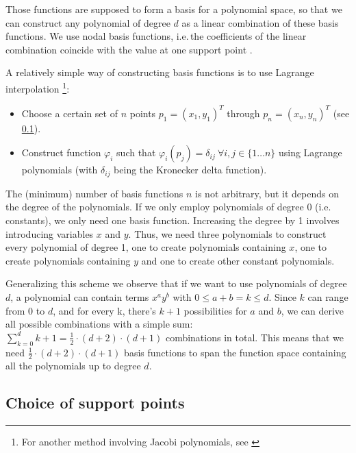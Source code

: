 \documentclass{article}
\renewcommand{\phi}{\varphi}
\begin{document}
Those functions are supposed to form a basis for a polynomial space, so that we can construct any polynomial of degree $d$ as a linear combination of these basis functions. We use nodal basis functions, i.e.\,the coefficients of the linear combination coincide with the value at one support point \cite{boeck08discontinuous-galerkin-verfahren}.

A relatively simple way of constructing basis functions is to use Lagrange interpolation
\footnote{For another method involving Jacobi polynomials, see \cite{castro07high-order-ader-fv-dg-numerical-methods, hesthaven2007nodal}}:

\begin{itemize}
\item Choose a certain set of $n$ points $p_1=\left( x_1,y_1 \right)^T$ through $p_n=\left( x_n,y_n \right)^T$ (see \ref{sec:choice-support-points}).
\item Construct function $\phi_i$ such that $\phi_i(p_j) = \delta_{ij} \  \forall i,j \in \{1 \dots n\}$ using Lagrange polynomials (with $\delta_{ij}$ being the Kronecker delta function).
\end{itemize}

The (minimum) number of basis functions $n$ is not arbitrary, but it depends on the degree of the polynomials. If we only employ polynomials of degree 0 (i.e.\,constants), we only need one basis function. Increasing the degree by 1 involves introducing variables $x$ and $y$. Thus, we need three polynomials to construct every polynomial of degree 1, one to create polynomials containing $x$, one to create polynomials containing $y$ and one to create other constant polynomials.

Generalizing this scheme we observe that if we want to use polynomials of degree $d$, a polynomial can contain terms $x^a y^b$ with $0 \leq a+b = k \leq d$.
Since $k$ can range from 0 to $d$, and for every k, there's $k+1$ possibilities for $a$ and $b$, we can derive all possible combinations with a simple sum: $\sum_{k = 0}^d k+1 = \frac{1}{2} \cdot (d+2) \cdot (d+1)$ combinations in total.
This means that we need $\frac{1}{2} \cdot (d+2) \cdot (d+1)$ basis functions to span the function space containing all the polynomials up to degree $d$.

\subsection{Choice of support points}
\label{sec:choice-support-points}
\end{document}
